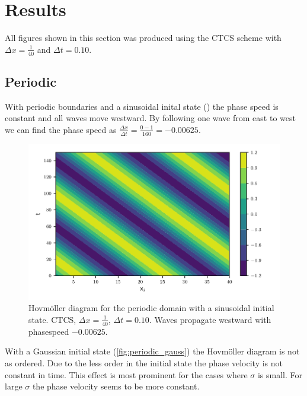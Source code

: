 \newpage
\section{Results}


All figures shown in this section was produced using the CTCS scheme with
$\Delta x = \frac{1}{40} $ and $\Delta t = 0.10$.

\subsection{Periodic}

With periodic boundaries and a sinusoidal inital state ()
the phase speed is constant and all waves move westward. By following one wave
from east to west we can find the phase speed as $\frac{\Delta x}{\Delta t} =
\frac{0-1}{160} = -0.00625$.

\begin{figure}[H]
  \centering
  \includegraphics[width=\textwidth]{../figures/psi_periodic_centered_short.pdf}
  \caption{Hovmöller diagram for the periodic domain with a sinusoidal initial state. CTCS, $\Delta x = \frac{1}{40}$, $\Delta t = 0.10$. Waves propagate westward with phasespeed
  $-0.00625$.}
  \label{fig:periodic_sine}
\end{figure}

With a Gaussian initial state (\cref{fig:periodic_gauss}) the Hovmöller diagram
is not as ordered. Due to the less order in the initial state the phase velocity
is not constant in time. This effect is most prominent for the cases where
$\sigma$ is small. For large $\sigma$ the phase velocity seems to be more
constant.


